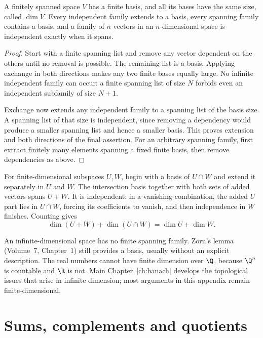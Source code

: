 \begin{theorem}[dimension]\label{linear:thm:dim}
A finitely spanned space $V$ has a finite basis, and all its bases have the same size, called $\dim V$. Every independent family extends to a basis, every spanning family contains a basis, and a family of $n$ vectors in an $n$-dimensional space is independent exactly when it spans.
\end{theorem}
\begin{proof}
Start with a finite spanning list and remove any vector dependent on the others until no removal is possible. The remaining list is a basis. Applying exchange in both directions makes any two finite bases equally large. No infinite independent family can occur: a finite spanning list of size $N$ forbids even an independent subfamily of size $N+1$.

Exchange now extends any independent family to a spanning list of the basis size. A spanning list of that size is independent, since removing a dependency would produce a smaller spanning list and hence a smaller basis. This proves extension and both directions of the final assertion. For an arbitrary spanning family, first extract finitely many elements spanning a fixed finite basis, then remove dependencies as above.
\end{proof}

For finite-dimensional subspaces $U,W$, begin with a basis of $U\cap W$ and extend it separately in $U$ and $W$. The intersection basis together with both sets of added vectors spans $U+W$. It is independent: in a vanishing combination, the added $U$ part lies in $U\cap W$, forcing its coefficients to vanish, and then independence in $W$ finishes. Counting gives
\[\dim(U+W)+\dim(U\cap W)=\dim U+\dim W.
\]

\begin{remark}
An infinite-dimensional space has no finite spanning family. Zorn's lemma (Volume~7, Chapter~1) still provides a basis, usually without an explicit description. The real numbers cannot have finite dimension over $\Q$, because $\Q^n$ is countable and $\R$ is not. Main Chapter~\ref{ch:banach} develops the topological issues that arise in infinite dimension; most arguments in this appendix remain finite-dimensional.
\end{remark}

\section{Sums, complements and quotients}\label{linear:sec:quotients}


